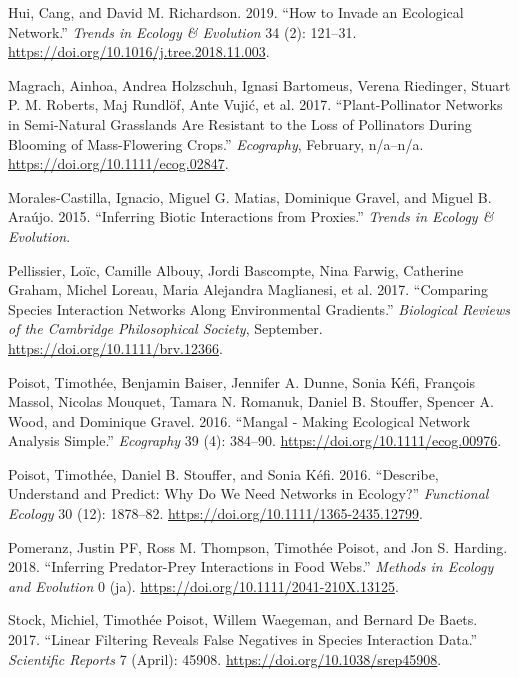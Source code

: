 \leavevmode\hypertarget{ref-HuiRich19}{}%
Hui, Cang, and David M. Richardson. 2019. ``How to Invade an Ecological
Network.'' \emph{Trends in Ecology \& Evolution} 34 (2): 121--31.
\url{https://doi.org/10.1016/j.tree.2018.11.003}.

\leavevmode\hypertarget{ref-MagrHolz17}{}%
Magrach, Ainhoa, Andrea Holzschuh, Ignasi Bartomeus, Verena Riedinger,
Stuart P. M. Roberts, Maj Rundlöf, Ante Vujić, et al. 2017.
``Plant-Pollinator Networks in Semi-Natural Grasslands Are Resistant to
the Loss of Pollinators During Blooming of Mass-Flowering Crops.''
\emph{Ecography}, February, n/a--n/a.
\url{https://doi.org/10.1111/ecog.02847}.

\leavevmode\hypertarget{ref-MoraMati15}{}%
Morales-Castilla, Ignacio, Miguel G. Matias, Dominique Gravel, and
Miguel B. Araújo. 2015. ``Inferring Biotic Interactions from Proxies.''
\emph{Trends in Ecology \& Evolution}.

\leavevmode\hypertarget{ref-PellAlbo17}{}%
Pellissier, Loïc, Camille Albouy, Jordi Bascompte, Nina Farwig,
Catherine Graham, Michel Loreau, Maria Alejandra Maglianesi, et al.
2017. ``Comparing Species Interaction Networks Along Environmental
Gradients.'' \emph{Biological Reviews of the Cambridge Philosophical
Society}, September. \url{https://doi.org/10.1111/brv.12366}.

\leavevmode\hypertarget{ref-PoisBais16}{}%
Poisot, Timothée, Benjamin Baiser, Jennifer A. Dunne, Sonia Kéfi,
François Massol, Nicolas Mouquet, Tamara N. Romanuk, Daniel B. Stouffer,
Spencer A. Wood, and Dominique Gravel. 2016. ``Mangal - Making
Ecological Network Analysis Simple.'' \emph{Ecography} 39 (4): 384--90.
\url{https://doi.org/10.1111/ecog.00976}.

\leavevmode\hypertarget{ref-PoisStou16}{}%
Poisot, Timothée, Daniel B. Stouffer, and Sonia Kéfi. 2016. ``Describe,
Understand and Predict: Why Do We Need Networks in Ecology?''
\emph{Functional Ecology} 30 (12): 1878--82.
\url{https://doi.org/10.1111/1365-2435.12799}.

\leavevmode\hypertarget{ref-PomeThom18}{}%
Pomeranz, Justin PF, Ross M. Thompson, Timothée Poisot, and Jon S.
Harding. 2018. ``Inferring Predator-Prey Interactions in Food Webs.''
\emph{Methods in Ecology and Evolution} 0 (ja).
\url{https://doi.org/10.1111/2041-210X.13125}.

\leavevmode\hypertarget{ref-StocPois17}{}%
Stock, Michiel, Timothée Poisot, Willem Waegeman, and Bernard De Baets.
2017. ``Linear Filtering Reveals False Negatives in Species Interaction
Data.'' \emph{Scientific Reports} 7 (April): 45908.
\url{https://doi.org/10.1038/srep45908}.

